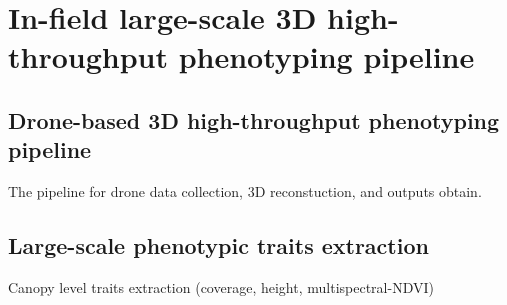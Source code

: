 \chapter{In-field large-scale 3D high-throughput phenotyping pipeline}

\section{Drone-based 3D high-throughput phenotyping pipeline}

The pipeline for drone data collection, 3D reconstuction, and outputs obtain.


\section{Large-scale phenotypic traits extraction}

Canopy level traits extraction (coverage, height, multispectral-NDVI)

\newpage


\newpage
